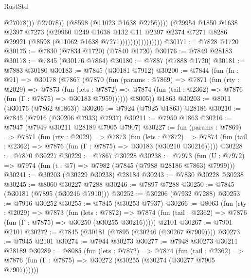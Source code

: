 \begin{lexlean}{RustStd}
\begin{coremodule}
                                          @27078)))
                                    @27078))
                                (@8598 (@11023 @1638 @2756))))
                            (@29954
                              @1850
                              @1638
                              @2397
                              @7273
                              (@29960
                                @249
                                @1638
                                @132
                                @11
                                @2397
                                @2374
                                @7271
                                @8286
                                @29921
                                (@8598 (@11062 @1638 @7271))))))))))))))))
@30171 := @7828 @1720
@30175 := @7830 (@7834 @1720) (@7840 @1720)
@30176 := @7849 @28183
@30178 := @7845 (@30176 @7864)
@30180 := @7887 (@7888 @1720)
@30181 := @7883 @30180
@30183 := @7845 (@30181 @7912)
@30200 := @7844
    (fun (fn : @91) =>
    @30178
      (@7867
        (@7870
          (fun (params : @7869) =>
          @7871
            (fun (rty : @2029) =>
            @7873
              (fun (lets : @7872) =>
              @7874 (fun (tail : @2362) => @7876 (fun (Γ : @7875) => @30183 @7959))))))
        @8005))
    @1863
@30203 := @8011 (@30176 (@7862 @1863))
@30206 := @7924 (@7925 @1863) @28186
@30210 := @7845 (@7916 (@30206 @7933) @7937)
@30211 := @7950 @1863
@30216 := @7947 (@7949 @30211 @28189 @7905 @7907)
@30227 := fun (params : @7869) =>
  @7871
    (fun (rty : @2029) =>
    @7873
      (fun (lets : @7872) =>
      @7874 (fun (tail : @2362) => @7876 (fun (Γ : @7875) => @30183 (@30210 @30216)))))
@30228 := @7870 @30227
@30229 := @7867 @30228
@30238 := @7973
    (fun (U : @7972) => @7974 (fun (t : @7) => @7982 (@7845 (@7988 @28186 @7863) @7999)))
@30241 := @30203 (@30229 @30238) @28184
@30243 := @7830 @30228 @30238
@30245 := @8060 @30227 @7288
@30246 := @7897 @7288
@30250 := @7845 (@30181 (@7895 (@30246 @7910)))
@30252 := @30206 (@7932 @7288)
@30253 := @7916 @30252
@30255 := @7845 (@30253 @7937)
@30266 := @8063
    (fun (rty : @2029) =>
    @7873
      (fun (lets : @7872) =>
      @7874 (fun (tail : @2362) => @7876 (fun (Γ : @7875) => @30250 (@30255 @30216)))))
    @2101
@30267 := @7901 @2101
@30272 := @7845 (@30181 (@7895 (@30246 (@30267 @7909))))
@30273 := @7945 @2101
@30274 := @7944 @30273
@30277 := @7948 @30273 @30211 @28189
@30289 := @8085
    (fun (lets : @7872) =>
    @7874
      (fun (tail : @2362) =>
      @7876 (fun (Γ : @7875) => @30272 (@30255 (@30274 (@30277 @7905 @7907))))))

\end{coremodule}
\end{lexlean}
